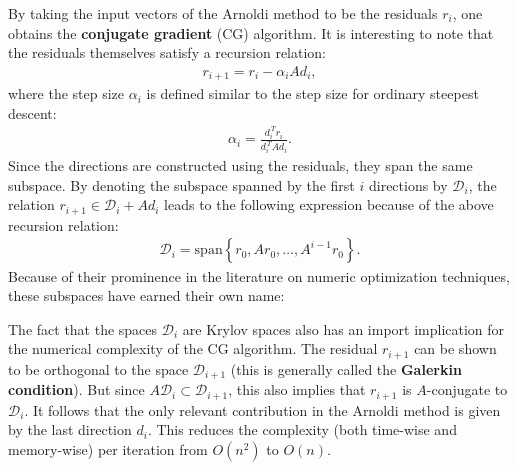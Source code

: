     By taking the input vectors of the Arnoldi method to be the residuals $r_i$, one obtains the \textbf{conjugate gradient} (CG) algorithm. It is interesting to note that the residuals themselves satisfy a recursion relation:
    \begin{gather}
        r_{i+1} = r_i - \alpha_iAd_i,
    \end{gather}
    where the step size $\alpha_i$ is defined similar to the step size for ordinary steepest descent:
    \begin{gather}
        \alpha_i = \frac{d_i^{\,T}r_i}{d_i^{\,T}\!Ad_i}.
    \end{gather}
    Since the directions are constructed using the residuals, they span the same subspace. By denoting the subspace spanned by the first $i$ directions by $\mathcal{D}_i$, the relation $r_{i+1}\in\mathcal{D}_i+Ad_i$ leads to the following expression because of the above recursion relation:
    \begin{gather}
        \mathcal{D}_i = \mathrm{span}\left\{r_0,Ar_0,\ldots,A^{i-1}r_0\right\}.
    \end{gather}
    Because of their prominence in the literature on numeric optimization techniques, these subspaces have earned their own name:

    The fact that the spaces $\mathcal{D}_i$ are Krylov spaces also has an import implication for the numerical complexity of the CG algorithm. The residual $r_{i+1}$ can be shown to be orthogonal to the space $\mathcal{D}_{i+1}$ (this is generally called the \textbf{Galerkin condition}). But since $A\mathcal{D}_i\subset\mathcal{D}_{i+1}$, this also implies that $r_{i+1}$ is $A$-conjugate to $\mathcal{D}_i$. It follows that the only relevant contribution in the Arnoldi method is given by the last direction $d_i$. This reduces the complexity (both time-wise and memory-wise) per iteration from $O(n^2)$ to $O(n)$.


